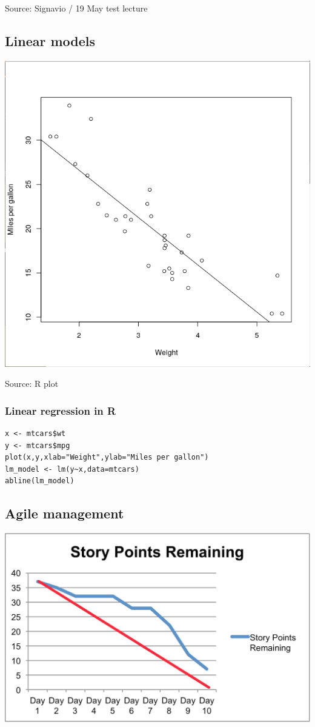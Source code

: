 \documentclass[11pt]{article}
\begin{document}
Source: Signavio / 19 May test lecture

\subsection*{Linear models}
\label{sec:org954ccd8}

\begin{center}
\includegraphics[width=.9\linewidth]{./img/linear.png}
\end{center}

Source: R plot
\subsubsection*{Linear regression in R}
\label{sec:org969cc9a}

\begin{verbatim}
x <- mtcars$wt
y <- mtcars$mpg
plot(x,y,xlab="Weight",ylab="Miles per gallon")
lm_model <- lm(y~x,data=mtcars)
abline(lm_model)
\end{verbatim}

\subsection*{Agile management}
\label{sec:org51f4722}

\begin{center}
\includegraphics[width=.9\linewidth]{./img/burndown.jpg}
\end{center}
\end{document}

